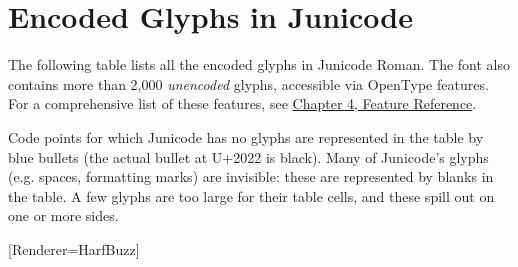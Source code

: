 \chapter{Encoded Glyphs in Junicode}\hypertarget{EncodedGlyphs}{}

\noindent The following table lists all the encoded glyphs in Junicode Roman. The font also
contains more than 2,000 \emph{unencoded} glyphs,
accessible via OpenType features. For a comprehensive list of these features, see
\hyperlink{FeatureReference}{Chapter 4, Feature Reference}.

Code points for which Junicode has no glyphs are represented in the table by blue
bullets (the actual bullet at U+2022 is black).
Many of Junicode's glyphs (e.g. spaces, formatting marks) are invisible: these
are represented by blanks in the table. A few glyphs are too large for their table cells,
and these spill out on one or more sides.

[Renderer=HarfBuzz]

